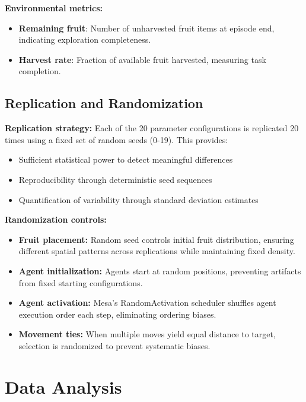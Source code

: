 \textbf{Environmental metrics:}
\begin{itemize}
    \item \textbf{Remaining fruit}: Number of unharvested fruit items at episode end, indicating exploration completeness.

    \item \textbf{Harvest rate}: Fraction of available fruit harvested, measuring task completion.
\end{itemize}

\subsection{Replication and Randomization}

\textbf{Replication strategy:} Each of the 20 parameter configurations is replicated 20 times using a fixed set of random seeds (0-19). This provides:
\begin{itemize}
    \item Sufficient statistical power to detect meaningful differences
    \item Reproducibility through deterministic seed sequences
    \item Quantification of variability through standard deviation estimates
\end{itemize}

\textbf{Randomization controls:}
\begin{itemize}
    \item \textbf{Fruit placement:} Random seed controls initial fruit distribution, ensuring different spatial patterns across replications while maintaining fixed density.

    \item \textbf{Agent initialization:} Agents start at random positions, preventing artifacts from fixed starting configurations.

    \item \textbf{Agent activation:} Mesa's RandomActivation scheduler shuffles agent execution order each step, eliminating ordering biases.

    \item \textbf{Movement ties:} When multiple moves yield equal distance to target, selection is randomized to prevent systematic biases.
\end{itemize}

\section{Data Analysis}

